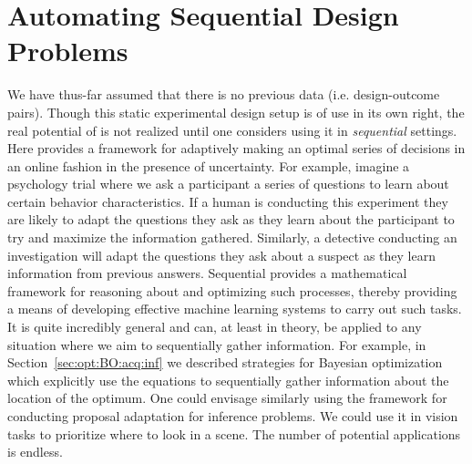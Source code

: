 
\section{Automating Sequential Design Problems}
\label{sec:design:seq}

We have thus-far assumed that there is no previous data (i.e. design-outcome pairs).
Though this static experimental design setup is of use in its own right, the real potential
of \Bad is not realized until one considers using it in \emph{sequential} settings.
Here \Bad provides a framework for adaptively making an optimal series of decisions
in an online fashion in the presence of uncertainty.  For example, imagine a psychology
trial where we ask a participant a series of questions to learn about certain behavior
characteristics.  If a human is conducting this experiment they are likely to adapt
the questions they ask as they learn about the participant to try and maximize the information
gathered.  Similarly, a detective conducting an investigation will
adapt the questions they ask about a suspect as they learn information from previous
answers.  Sequential \Bad provides a mathematical framework for reasoning about and optimizing
such processes, thereby providing a means of developing effective machine learning systems to
carry out such tasks.
  It is quite incredibly general and can, at least in theory, be applied to any
situation where we aim to sequentially gather information.  For example, in Section~\ref{sec:opt:BO:acq:inf}
we described strategies for Bayesian optimization which explicitly use the \Bad equations
to sequentially gather information about the location of the optimum.  One could envisage similarly
using the framework for conducting proposal adaptation for inference problems.  We could
use it in vision tasks to prioritize where to look in a scene.  The number of potential
applications is endless.

